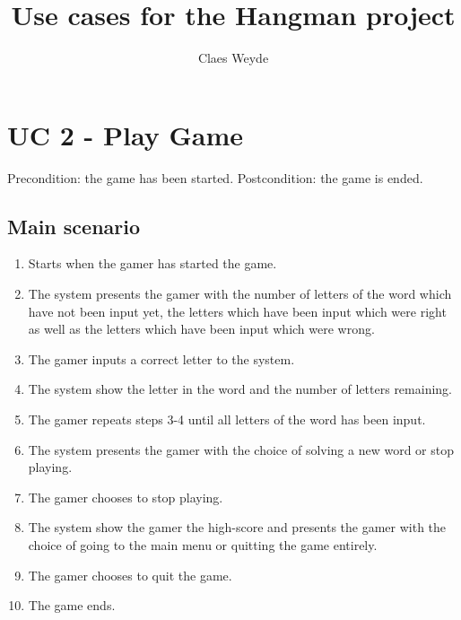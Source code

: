 \documentclass[12pt, letterpaper]{article}
\title{Use cases for the Hangman project}
\author{Claes Weyde}
\begin{document}
\maketitle
\newpage
\tableofcontents{}
\newpage

\section{UC 2 - Play Game}
Precondition: the game has been started.
\newline
Postcondition: the game is ended.

\subsection{Main scenario}
\begin{enumerate}
	\item Starts when the gamer has started the game.
	\item The system presents the gamer with the number of letters of the word which have not been input yet, the letters which have been input which were right as well as the letters which have been input which were wrong.
	\item The gamer inputs a correct letter to the system.
	\item The system show the letter in the word and the number of letters remaining.
	\item The gamer repeats steps 3-4 until all letters of the word has been input.
	\item The system presents the gamer with the choice of solving a new word or stop playing.
	\item The gamer chooses to stop playing.
	\item The system show the gamer the high-score and presents the gamer with the choice of going to the main menu or quitting the game entirely.
	\item The gamer chooses to quit the game.
	\item The game ends. 
\end{enumerate}
\end{document}
